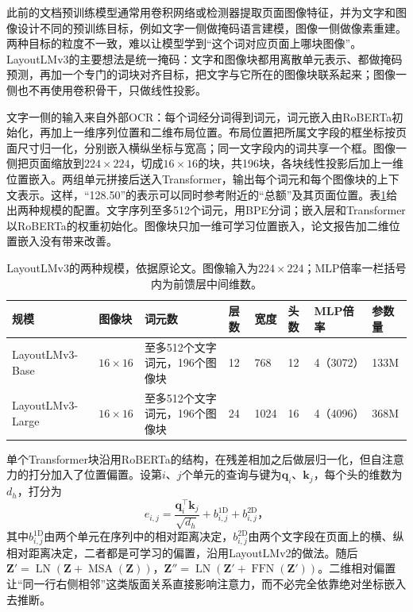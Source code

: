 此前的文档预训练模型通常用卷积网络或检测器提取页面图像特征，并为文字和图像设计不同的预训练目标，例如文字一侧做掩码语言建模，图像一侧做像素重建。两种目标的粒度不一致，难以让模型学到“这个词对应页面上哪块图像”。LayoutLMv3的主要想法是统一掩码：文字和图像块都用离散单元表示、都做掩码预测，再加一个专门的词块对齐目标，把文字与它所在的图像块联系起来；图像一侧也不再使用卷积骨干，只做线性投影。

文字一侧的输入来自外部OCR：每个词经分词得到词元，词元嵌入由RoBERTa初始化，再加上一维序列位置和二维布局位置。布局位置把所属文字段的框坐标按页面尺寸归一化，分别嵌入横纵坐标与宽高；同一文字段内的词共享一个框。图像一侧把页面缩放到$224\times224$，切成$16\times16$的块，共196块，各块线性投影后加上一维位置嵌入。两组单元拼接后送入Transformer，输出每个词元和每个图像块的上下文表示。这样，“128.50”的表示可以同时参考附近的“总额”及其页面位置。表\ref{tab:vision-understanding-layoutlmv3-config}给出两种规模的配置。文字序列至多512个词元，用BPE分词；嵌入层和Transformer以RoBERTa的权重初始化。图像块只加一维可学习位置嵌入，论文报告加二维位置嵌入没有带来改善。

\begin{table}[tbp]
  \centering
  \small
  \begin{tabularx}{\linewidth}{@{}p{22mm}p{12mm}Xp{8mm}p{10mm}p{8mm}p{14mm}p{12mm}@{}}
    \toprule
    规模 & 图像块 & 词元数 & 层数 & 宽度 & 头数 & MLP倍率 & 参数量\\
    \midrule
    LayoutLMv3-Base & $16\times16$ & 至多512个文字词元，196个图像块 & 12 & 768 & 12 & 4（3072） & 133M\\
    LayoutLMv3-Large & $16\times16$ & 至多512个文字词元，196个图像块 & 24 & 1024 & 16 & 4（4096） & 368M\\
    \bottomrule
  \end{tabularx}
  \caption{LayoutLMv3的两种规模，依据原论文。图像输入为$224\times224$；MLP倍率一栏括号内为前馈层中间维数。}
  \label{tab:vision-understanding-layoutlmv3-config}
\end{table}

单个Transformer块沿用RoBERTa的结构，在残差相加之后做层归一化，但自注意力的打分加入了位置偏置。设第$i$、$j$个单元的查询与键为$\bm q_i$、$\bm k_j$，每个头的维数为$d_h$，打分为
\[
  e_{i,j}=\frac{\bm q_i^\top\bm k_j}{\sqrt{d_h}}+b^{\mathrm{1D}}_{i,j}+b^{\mathrm{2D}}_{i,j}\text{，}
\]
其中$b^{\mathrm{1D}}_{i,j}$由两个单元在序列中的相对距离决定，$b^{\mathrm{2D}}_{i,j}$由两个文字段在页面上的横、纵相对距离决定，二者都是可学习的偏置，沿用LayoutLMv2的做法。随后$\bm Z'=\operatorname{LN}(\bm Z+\operatorname{MSA}(\bm Z))$，$\bm Z''=\operatorname{LN}(\bm Z'+\operatorname{FFN}(\bm Z'))$。二维相对偏置让“同一行右侧相邻”这类版面关系直接影响注意力，而不必完全依靠绝对坐标嵌入去推断。

